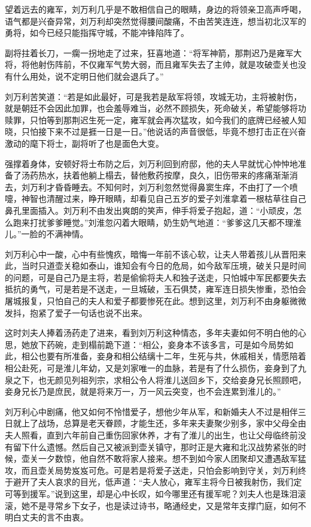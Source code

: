 望着远去的雍军，刘万利几乎是不敢相信自己的眼睛，身边的将领亲卫高声呼喝，语气都是兴奋异常，刘万利却突然觉得腰间酸痛，不由苦笑连连，想当初北汉军的勇将，如今已经只能指挥守城，不能冲锋陷阵了。

副将拄着长刀，一瘸一拐地走了过来，狂喜地道：“将军神箭，那荆迟乃是雍军大将，将他射伤阵前，不仅雍军气势大弱，而且雍军失去了主帅，就是攻破壶关也没有什么用处，说不定明日他们就会退兵了。”

刘万利苦笑道：“若是如此最好，可是我若是敌军将领，攻城无功，主将被射伤，就是朝廷不会因此加罪，也会羞辱难当，必然不顾损失，死命破关，希望能够将功赎罪，只怕等到那荆迟生死一定，雍军就会再次猛攻，如今我们的底牌已经被人知晓，只怕接下来不过是捱一日是一日。”他说话的声音很低，毕竟不想打击正在兴奋激动的麾下将士，副将听了也是面色大变。

强撑着身体，安顿好将士布防之后，刘万利回到府邸，他的夫人早就忧心忡忡地准备了汤药热水，扶着他躺上榻去，替他敷药按摩，良久，旧伤带来的疼痛渐渐消去，刘万利才昏昏睡去。不知何时，刘万利忽然觉得鼻窦生痒，不由打了一个喷嚏，神智也清醒过来，睁开眼睛，却看见自己五岁的爱子刘淮拿着一根枯草往自己鼻孔里面插入。刘万利不由发出爽朗的笑声，伸手将爱子抱起，道：“小顽皮，怎么跑来打扰爹爹睡觉。”刘淮忽闪着大眼睛，奶生奶气地道：“爹爹这几天都不理淮儿。”一脸的不满神情。

刘万利心中一酸，心中有些愧疚，暗悔一年前不该心软，让夫人带着孩儿从晋阳来此，当时只道壶关稳如泰山，谁知会有今日的危局，如今敌军压境，破关只是时间的问题，可是自己乃是主将，若是偷偷将夫人和独子送走，只怕城中军民都要失去抵抗的勇气，可是若是不送走，一旦城破，玉石俱焚，雍军连日损失惨重，恐怕会屠城报复，只怕自己的夫人和爱子都要惨死在此。想到这里，刘万利不由身躯微微发抖，抱紧了爱子一句话也说不出来。

这时刘夫人捧着汤药走了进来，看到刘万利这种情态，多年夫妻如何不明白他的心思，她放下药碗，走到榻前跪下道：“相公，妾身本不该多言，可是如今局势如此，相公也要有所准备，妾身和相公结缡十二年，生死与共，休戚相关，情愿陪着相公赴死，可是淮儿年幼，又是刘家唯一的血脉，若是有了什么损伤，妾身到了九泉之下，也无颜见列祖列宗，求相公令人将淮儿送回乡下，交给妾身兄长照顾吧，妾身兄长乃是庶民，就是将来万一，万一风云突变，也不会连累到淮儿的。”

刘万利心中剧痛，他又如何不怜惜爱子，想他少年从军，和新婚夫人不过是相伴三日就上了战场，总算是老天眷顾，才能生还，多年来夫妻聚少别多，家中父母全由夫人照看，直到六年前自己重伤回家休养，才有了淮儿的出生，也让父母临终前没有留下什么遗憾。然后自己又被派到壶关镇守，那时正是大雍和北汉战势紧张的时候，壶关一夕数惊，他自然不敢将家人接来。想不到如今家人团聚却又遭遇敌军猛攻，而且壶关局势岌岌可危。可是若是将爱子送走，只怕会影响到守关，刘万利终于避开了夫人哀求的目光，低声道：“夫人放心，雍军主将今日被我射伤，我们定可等到援军。”说到这里，却是心中长叹，如今哪里还有援军呢？刘夫人也是珠泪滚滚，她不是寻常乡下女子，也是读过诗书，略通经史，又是常年支撑门庭，如何不明白丈夫的言不由衷。


